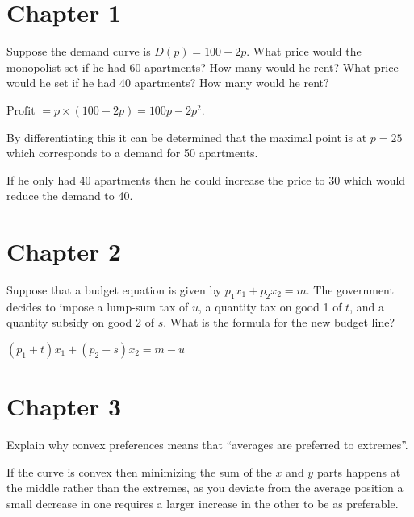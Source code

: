 \documentclass{supervision}
\begin{document}
  \begin{questions}
    \section*{Chapter 1}
    \question Suppose the demand curve is $D(p) = 100 - 2p$. What price would
      the monopolist set if he had 60 apartments? How many would he rent? What
      price would he set if he had 40 apartments? How many would he rent?

      \begin{solution}
        $\mbox{Profit } = p \times (100 - 2p) = 100p - 2p^2$.

        By differentiating this it can be determined that the maximal point is
        at $p = 25$ which corresponds to a demand for 50 apartments.

        If he only had 40 apartments then he could increase the price to 30
        which would reduce the demand to 40.
      \end{solution}

    \section*{Chapter 2}
    \question Suppose that a budget equation is given by $p_1 x_1 + p_2 x_2 =
      m$. The government decides to impose a lump-sum tax of $u$, a quantity tax
      on good 1 of $t$, and a quantity subsidy on good 2 of $s$. What is the
      formula for the new budget line?

      \begin{solution}
        $ (p_1 + t) x_1 + (p_2 - s) x_2 = m - u$
      \end{solution}

    \section*{Chapter 3}
    \question Explain why convex preferences means that ``averages are preferred
      to extremes''.

      \begin{solution}
        If the curve is convex then minimizing the sum of the $x$ and $y$ parts
        happens at the middle rather than the extremes, as you deviate from the
        average position a small decrease in one requires a larger increase in
        the other to be as preferable.
      \end{solution}


\end{questions}
\end{document}
